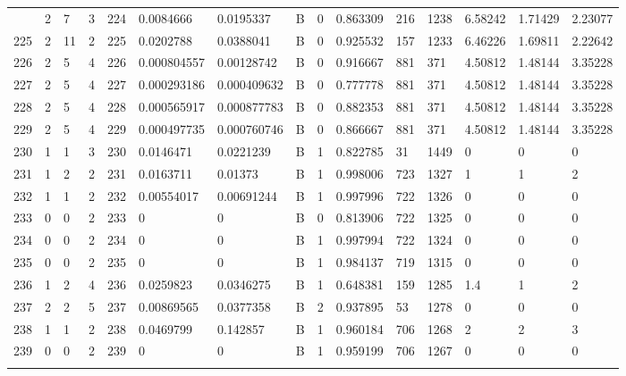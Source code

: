 \begin{latin}
\begin{longtable}{lllllllllllllll}
\begin{comment}
	224 & 2  & 7   & 3  & 224 & 0.0084666      & 0.0195337      & B & 0  & 0.863309 & 216  & 1238 & 6.58242 & 1.71429 & 2.23077 \\
	225 & 2  & 11  & 2  & 225 & 0.0202788      & 0.0388041      & B & 0  & 0.925532 & 157  & 1233 & 6.46226 & 1.69811 & 2.22642 \\
	226 & 2  & 5   & 4  & 226 & 0.000804557    & 0.00128742     & B & 0  & 0.916667 & 881  & 371  & 4.50812 & 1.48144 & 3.35228 \\
	227 & 2  & 5   & 4  & 227 & 0.000293186    & 0.000409632    & B & 0  & 0.777778 & 881  & 371  & 4.50812 & 1.48144 & 3.35228 \\
	228 & 2  & 5   & 4  & 228 & 0.000565917    & 0.000877783    & B & 0  & 0.882353 & 881  & 371  & 4.50812 & 1.48144 & 3.35228 \\
	229 & 2  & 5   & 4  & 229 & 0.000497735    & 0.000760746    & B & 0  & 0.866667 & 881  & 371  & 4.50812 & 1.48144 & 3.35228 \\
	230 & 1  & 1   & 3  & 230 & 0.0146471      & 0.0221239      & B & 1  & 0.822785 & 31   & 1449 & 0       & 0       & 0       \\
	231 & 1  & 2   & 2  & 231 & 0.0163711      & 0.01373        & B & 1  & 0.998006 & 723  & 1327 & 1       & 1       & 2       \\
	232 & 1  & 1   & 2  & 232 & 0.00554017     & 0.00691244     & B & 1  & 0.997996 & 722  & 1326 & 0       & 0       & 0       \\
	233 & 0  & 0   & 2  & 233 & 0              & 0              & B & 0  & 0.813906 & 722  & 1325 & 0       & 0       & 0       \\
	234 & 0  & 0   & 2  & 234 & 0              & 0              & B & 1  & 0.997994 & 722  & 1324 & 0       & 0       & 0       \\
	235 & 0  & 0   & 2  & 235 & 0              & 0              & B & 1  & 0.984137 & 719  & 1315 & 0       & 0       & 0       \\
	236 & 1  & 2   & 4  & 236 & 0.0259823      & 0.0346275      & B & 1  & 0.648381 & 159  & 1285 & 1.4     & 1       & 2       \\
	237 & 2  & 2   & 5  & 237 & 0.00869565     & 0.0377358      & B & 2  & 0.937895 & 53   & 1278 & 0       & 0       & 0       \\
	238 & 1  & 1   & 2  & 238 & 0.0469799      & 0.142857       & B & 1  & 0.960184 & 706  & 1268 & 2       & 2       & 3       \\
	239 & 0  & 0   & 2  & 239 & 0              & 0              & B & 1  & 0.959199 & 706  & 1267 & 0       & 0       & 0       \\

\end{comment}
\end{longtable}
\end{latin}
